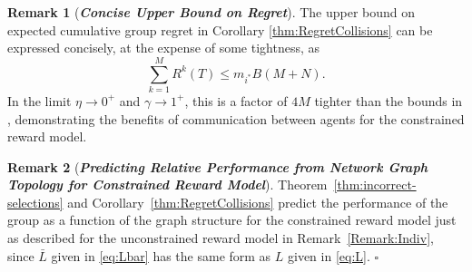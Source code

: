 \documentclass[final,5p,times,twocolumn]{elsarticle}
\theoremstyle{definition}
\newtheorem{remark}{Remark}
\newcommand\oprocendsymbol{\hbox{$\square$}}
\newcommand\oprocend{\relax\ifmmode\else\unskip\hfill\fi\oprocendsymbol}
\newcommand\bit[1]{\textit{\textbf{#1}}}
\begin{document}
\begin{remark}[\bit{Concise Upper Bound on Regret}] \label{Remark:RegretCollisionsConcise}
	The upper bound on expected cumulative group regret in Corollary \ref{thm:RegretCollisions} can be expressed concisely, at the expense of some tightness, as
	\begin{equation}
		\sum_{k=1}^M \!  R^k(T)   \leq  m_{i^*} B (M+N). \nonumber
	\end{equation}
	In the limit $\eta \to 0^+$ and $\gamma \to 1^+$, this is a factor of $4M$ tighter than the bounds in \cite{gai2014distributed}, demonstrating the benefits of communication between agents for the constrained reward model.
\end{remark}

\begin{remark}[\bit{{Predicting Relative Performance from Network Graph Topology for Constrained Reward Model}}] \label{Remark:Indiv_Constrained}
	Theorem~\ref{thm:incorrect-selections} and Corollary~\ref{thm:RegretCollisions} predict the performance of the group as a function of the graph structure for the constrained reward model just as described for the unconstrained reward model in Remark~\ref{Remark:Indiv}, since $\bar L$ given in \eqref{eq:Lbar} has the same form as $L$ given in \eqref{eq:L}.
	\oprocend
\end{remark}



\makeatletter
{}
				\makeatother
				
\end{document}
